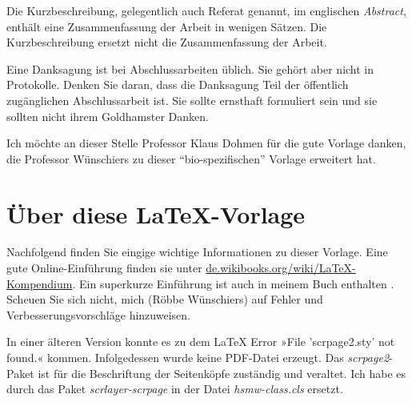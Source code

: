 \documentclass[nomenclature, norefpage, oneside, glossary, hypertext,multiauthor]{hsmw-class}
\begin{document}





\begin{Kurzbeschreibung}
Die Kurzbeschreibung, gelegentlich auch Referat genannt, im englischen \textit{Abstract}, enthält eine Zusammenfassung der Arbeit in wenigen Sätzen. Die Kurzbeschreibung ersetzt nicht die Zusammenfassung der Arbeit.
\end{Kurzbeschreibung}


\begin{Danksagung}
Eine Danksagung ist bei Abschlussarbeiten üblich. Sie gehört aber nicht in Protokolle. Denken Sie daran, dass die Danksagung Teil der öffentlich zugänglichen Abschlussarbeit ist. Sie sollte ernsthaft formuliert sein und sie sollten nicht ihrem Goldhamster Danken.

Ich möchte an dieser Stelle Professor Klaus Dohmen für die gute Vorlage danken, die Professor Wünschiers zu dieser \enquote{bio-spezifischen} Vorlage erweitert hat.
\end{Danksagung}


\Hauptteil %

\chapter{Über diese \LaTeX{}-Vorlage}
Nachfolgend finden Sie eingige wichtige Informationen zu dieser Vorlage. Eine gute Online-Einführung finden sie unter \url{de.wikibooks.org/wiki/LaTeX-Kompendium}. Ein superkurze Einführung ist auch in meinem Buch enthalten \citep{Wuenschiers2016kap12}.
Scheuen Sie sich nicht, mich (Röbbe Wünschiers) auf Fehler und Verbesserungsvorschläge hinzuweisen.

In einer älteren Version konnte es zu dem LaTeX Error »File 'scrpage2.sty' not found.« kommen. Infolgedessen wurde keine PDF-Datei erzeugt. Das \textit{scrpage2}-Paket ist für die Beschriftung der Seitenköpfe zuständig und veraltet. Ich habe es durch das Paket \textit{scrlayer-scrpage} in der Datei \textit{hsmw-class.cls} ersetzt.
\end{document}
